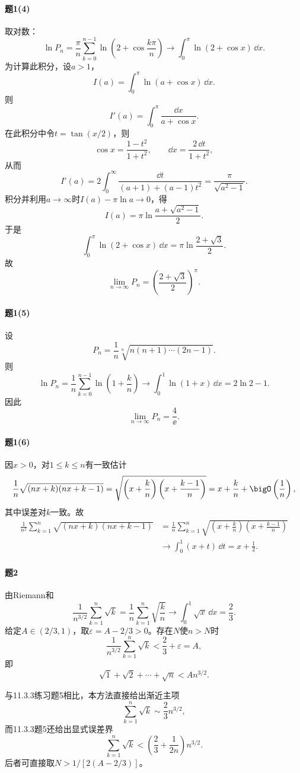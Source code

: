 \paragraph{题1(4)}
\begin{xsolution}
取对数：
\[
 \ln P_n=\frac\pi n\sum_{k=0}^{n-1}
 \ln\left(2+\cos\frac{k\pi}{n}\right)
 \longrightarrow\int_0^\pi\ln(2+\cos x)\,\dd x.
\]
为计算此积分，设$a>1$，
\[
 I(a)=\int_0^\pi\ln(a+\cos x)\,\dd x.
\]
则
\[
 I'(a)=\int_0^\pi\frac{\dd x}{a+\cos x}.
\]
在此积分中令$t=\tan(x/2)$，则
\[
 \cos x=\frac{1-t^2}{1+t^2},\qquad
 \dd x=\frac{2\,\dd t}{1+t^2},
\]
从而
\[
 I'(a)=2\int_0^\infty\frac{\dd t}{(a+1)+(a-1)t^2}
 =\frac\pi{\sqrt{a^2-1}}.
\]
积分并利用$a\to\infty$时$I(a)-\pi\ln a\to0$，得
\[
 I(a)=\pi\ln\frac{a+\sqrt{a^2-1}}2.
\]
于是
\[
 \int_0^\pi\ln(2+\cos x)\,\dd x
 =\pi\ln\frac{2+\sqrt3}{2}.
\]
故
\[
 \boxed{\lim_{n\to\infty}P_n=\left(\frac{2+\sqrt3}{2}\right)^\pi}.
\]
\end{xsolution}

\paragraph{题1(5)}
\begin{xsolution}
设
\[
 P_n=\frac1n\sqrt[n]{n(n+1)\cdots(2n-1)}.
\]
则
\[
 \ln P_n
 =\frac1n\sum_{k=0}^{n-1}\ln\left(1+\frac kn\right)
 \longrightarrow\int_0^1\ln(1+x)\,\dd x
 =2\ln2-1.
\]
因此
\[
 \boxed{\lim_{n\to\infty}P_n=\frac4\ee}.
\]
\end{xsolution}

\paragraph{题1(6)}
\begin{xsolution}
因$x>0$，对$1\le k\le n$有一致估计
\[
 \frac1n\sqrt{(nx+k)(nx+k-1)}
 =\sqrt{\left(x+\frac kn\right)
 \left(x+\frac{k-1}{n}\right)}
 =x+\frac kn+\bigO\left(\frac1n\right),
\]
其中误差对$k$一致。故
\begin{align*}
\frac1{n^2}\sum_{k=1}^n\sqrt{(nx+k)(nx+k-1)}
&=\frac1n\sum_{k=1}^n
\sqrt{\left(x+\frac kn\right)
\left(x+\frac{k-1}{n}\right)}\\
&\longrightarrow\int_0^1(x+t)\,\dd t
=\boxed{x+\frac12}.
\end{align*}
\end{xsolution}

\paragraph{题2}
\begin{xsolution}
由Riemann和
\[
 \frac1{n^{3/2}}\sum_{k=1}^n\sqrt k
 =\frac1n\sum_{k=1}^n\sqrt{\frac kn}
 \longrightarrow\int_0^1\sqrt x\,\dd x=\frac23.
\]
给定$A\in(2/3,1)$，取$\varepsilon=A-2/3>0$。存在$N$使$n>N$时
\[
 \frac1{n^{3/2}}\sum_{k=1}^n\sqrt k<\frac23+\varepsilon=A,
\]
即
\[
 \sqrt1+\sqrt2+\cdots+\sqrt n<An^{3/2}.
\]

与11.3.3练习题5相比，本方法直接给出渐近主项
\[
 \sum_{k=1}^n\sqrt k\sim\frac23n^{3/2},
\]
而11.3.3题5还给出显式误差界
\[
 \sum_{k=1}^n\sqrt k<\left(\frac23+\frac1{2n}\right)n^{3/2}.
\]
后者可直接取$N>1/[2(A-2/3)]$。
\end{xsolution}

